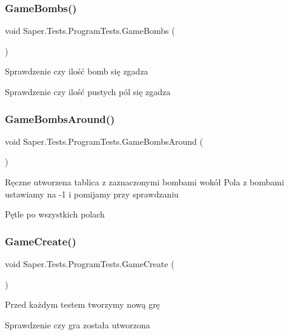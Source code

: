 \subsubsection{\texorpdfstring{GameBombs()}{GameBombs()}}
{\footnotesize\ttfamily void Saper.\+Tests.\+Program\+Tests.\+Game\+Bombs (\begin{DoxyParamCaption}{ }\end{DoxyParamCaption})}

Sprawdzenie czy ilość bomb się zgadza

Sprawdzenie czy ilość pustych pól się zgadza \mbox{\label{class_saper_1_1_tests_1_1_program_tests_a5385fbe423cd40ca4674ddc0060a2752}} 
\subsubsection{\texorpdfstring{GameBombsAround()}{GameBombsAround()}}
{\footnotesize\ttfamily void Saper.\+Tests.\+Program\+Tests.\+Game\+Bombs\+Around (\begin{DoxyParamCaption}{ }\end{DoxyParamCaption})}

Ręczne utworzena tablica z zaznaczonymi bombami wokół Pola z bombami ustawiamy na -\/1 i pomijamy przy sprawdzaniu

Pętle po wszystkich polach \mbox{\label{class_saper_1_1_tests_1_1_program_tests_a9774585fffb849f9c8b33c6e351748d8}} 
\subsubsection{\texorpdfstring{GameCreate()}{GameCreate()}}
{\footnotesize\ttfamily void Saper.\+Tests.\+Program\+Tests.\+Game\+Create (\begin{DoxyParamCaption}{ }\end{DoxyParamCaption})}



Przed każdym testem tworzymy nową grę 

Sprawdzenie czy gra została utworzona \mbox{\label{class_saper_1_1_tests_1_1_program_tests_a8a3221efdf3b62166f012dcf7e1ce68c}} 
